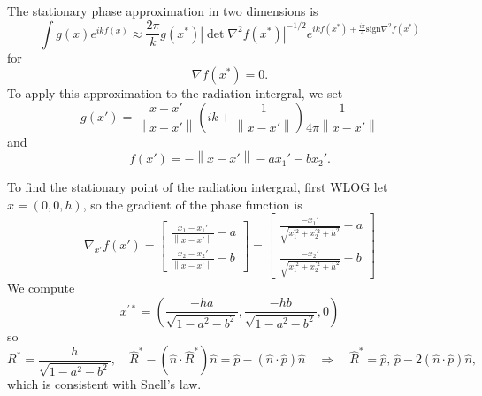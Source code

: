 \documentclass{article}
\newcommand{\norm}[1]{\left\lVert #1 \right\rVert}
\newcommand{\abs}[1]{\left\lvert #1 \right\rvert}
\theoremstyle{plain}
\begin{document}
The stationary phase approximation in two dimensions is
\begin{equation}
	\int g(x) e^{ikf(x)}
	\approx \frac{2\pi}{k} g(x^*)
	\abs{\det \nabla^2 f(x^*)}^{-1/2}
	e^{ikf(x^*) + \frac{i\pi}{4}\text{sign}\nabla^2 f(x^*)}
\end{equation}
for
\begin{equation}
	\nabla f(x^*) = 0.
\end{equation}
To apply this approximation to the radiation intergral,
we set
\begin{equation}
	g(x') = 
	\frac{x-x'}{\norm{x-x'}}
	\left( ik + \frac{1}{\norm{x-x'}} \right)
	\frac{1}{4\pi\norm{x-x'}}
\end{equation}
and
\begin{equation}
	f(x') = -\norm{x-x'} - ax_1' - bx_2'.
\end{equation}

To find the stationary point of the radiation intergral, first WLOG let $x=(0,0,h)$,
so the gradient of the phase function is
\begin{equation}
	\nabla_{x'} f(x') = 
	\begin{bmatrix}
		\frac{x_1 - x_1'}{\norm{x-x'}} - a \\
		\frac{x_2 - x_2'}{\norm{x-x'}} - b
	\end{bmatrix}
	=
	\begin{bmatrix}
		\frac{-x_1'}{\sqrt{x_1^{'2} + x_2^{'2} + h^2}} - a \\
		\frac{-x_2'}{\sqrt{x_1^{'2} + x_2^{'2} + h^2}} - b
	\end{bmatrix}
\end{equation} %
We compute
\begin{equation}
	x^{'*} = \left( \frac{-ha}{\sqrt{ 1 - a^2 - b^2 }}, \frac{-hb}{\sqrt{ 1 - a^2 - b^2 }}, 0 \right)
\end{equation}
so
\begin{equation}
	R^* = \frac{h}{\sqrt{1-a^2-b^2}},
	\quad \hat{R}^* - \left( \hat{n}\cdot\hat{R}^* \right)\hat{n} = \hat{p} - \left( \hat{n}\cdot\hat{p} \right)\hat{n}
	\quad\Rightarrow\quad \hat{R}^* =  \hat{p}\text{, } \hat{p} - 2\left( \hat{n}\cdot\hat{p} \right)\hat{n},
\end{equation}
which is consistent with Snell's law.
\end{document}
